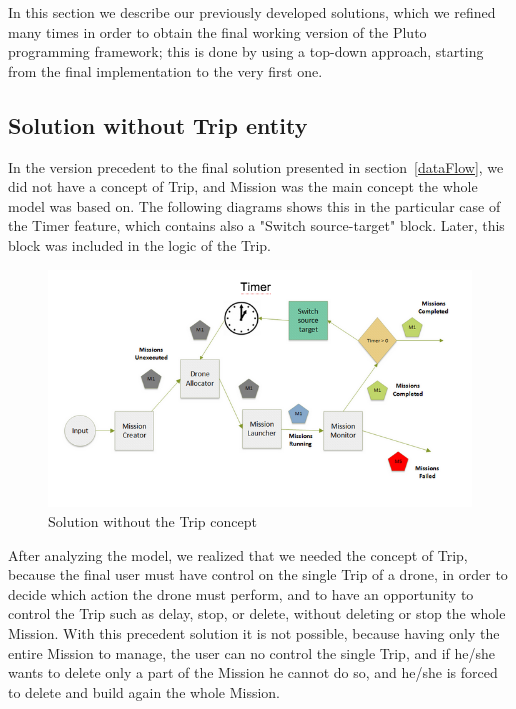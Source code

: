 In this section we describe our previously developed solutions, which we refined many times in order to obtain the final working version of the Pluto programming framework; this is done by using a top-down approach, starting from the final implementation to the very first one.

\subsection{Solution without Trip entity}

In the version precedent to the final solution presented in section~\ref{dataFlow}, we did not have a concept of Trip, and Mission was the main concept the whole model was based on. The following diagrams shows this in the particular case of the Timer feature, which contains also a "Switch source-target" block. Later, this block was included in the logic of the Trip.

\begin{figure}[H]
  \centering
  \includegraphics[width=\linewidth]{pictures/NoTrip.png}
  \caption{Solution without the Trip concept}
  \label{fig:noTrip}
\end{figure}

After analyzing the model, we realized that we needed the concept of Trip, because the final user must have control on the single Trip of a drone, in order to decide which action the drone must perform, and to have an opportunity to control the Trip such as delay, stop, or delete, without deleting or stop the whole Mission. With this precedent solution it is not possible, because having only the entire  Mission to manage, the user can no control the single Trip, and if he/she wants to delete only a part of the Mission he cannot do so, and he/she is forced to delete and build again the whole Mission.

